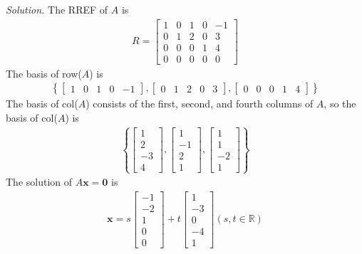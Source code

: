\noindent \textit{Solution.} The RREF of $A$ is \begin{align*}
R = \begin{bmatrix}
1 & 0 & 1 & 0 & -1 \\ 0 & 1 & 2 & 0 & 3 \\
0 & 0 & 0 & 1 & 4 \\ 0 & 0 & 0 & 0 & 0
\end{bmatrix}
\end{align*}
The basis of row($A$) is \begin{align*}
\left\{ \begin{bmatrix}
1 & 0 & 1 & 0 & -1
\end{bmatrix}, \begin{bmatrix}
0 & 1 & 2 & 0 & 3
\end{bmatrix}, \begin{bmatrix}
0 & 0 & 0 & 1 & 4
\end{bmatrix} \right\}
\end{align*}
The basis of col($A$) consists of the first, second, and fourth columns of $A$, so the basis of col($A$) is \begin{align*}
\left\{ \begin{bmatrix}
1 \\ 2 \\ -3 \\ 4
\end{bmatrix}, \begin{bmatrix}
1 \\ -1 \\ 2 \\ 1
\end{bmatrix}, \begin{bmatrix}
1 \\ 1 \\ -2 \\ 1
\end{bmatrix} \right\}
\end{align*}
The solution of $A\textbf{x} = \textbf{0}$ is \begin{align*}
\textbf{x} = s\begin{bmatrix}
-1 \\ -2 \\ 1 \\ 0 \\ 0
\end{bmatrix} + t\begin{bmatrix}
1 \\ -3 \\ 0 \\ -4 \\ 1
\end{bmatrix} (s,t \in \mathbb{R})
\end{align*}
